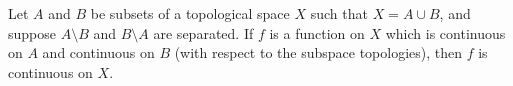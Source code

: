Let $A$ and $B$ be subsets of a topological space $X$ such that $X = A \cup B$, and suppose $A \setminus B$ and $B \setminus A$ are separated. If $f$ is a function on $X$ which is continuous on $A$ and continuous on $B$ (with respect to the subspace topologies), then $f$ is continuous on $X$.
